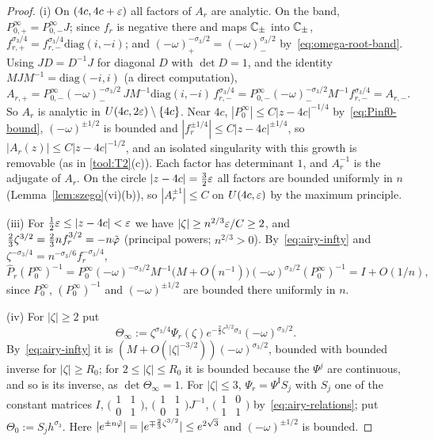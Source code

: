 \begin{proof}
(i) On $(4c,4c+\varepsilon)$ all factors of $A_r$ are analytic. On the band, $P^\infty_{0,+}=P^\infty_{0,-}J$; since $f_r$ is negative
there and maps $\mathbb{C}_\pm$ into $\mathbb{C}_\pm$, $f_{r,+}^{\sigma_3/4}=f_{r,-}^{\sigma_3/4}\mathrm{diag}(i,-i)$; and
$(-\omega)_+^{-\sigma_3/2}=(-\omega)_-^{\sigma_3/2}$ by~\eqref{eq:omega-root-band}. Using $JD=D^{-1}J$ for diagonal $D$ with
$\det D=1$, and the identity $MJM^{-1}=\mathrm{diag}(-i,i)$ (a direct computation),
\[
  A_{r,+}=P^\infty_{0,-}(-\omega)_-^{-\sigma_3/2}\,JM^{-1}\mathrm{diag}(i,-i)\,f_{r,-}^{\sigma_3/4}
  =P^\infty_{0,-}(-\omega)_-^{-\sigma_3/2}M^{-1}f_{r,-}^{\sigma_3/4}=A_{r,-}.
\]
So $A_r$ is analytic in $U(4c,2\varepsilon)\setminus\{4c\}$. Near $4c$, $|P^\infty_0|\le C|z-4c|^{-1/4}$ by~\eqref{eq:Pinf0-bound},
$(-\omega)^{\pm1/2}$ is bounded and $|f_r^{\pm1/4}|\le C|z-4c|^{\pm1/4}$, so $|A_r(z)|\le C|z-4c|^{-1/2}$, and an isolated
singularity with this growth is removable (as in \ref{tool:T2}(c)). Each factor has determinant $1$, and $A_r^{-1}$ is the
adjugate of $A_r$. On the circle $|z-4c|=\frac32\varepsilon$ all factors are bounded uniformly in $n$ (Lemma~\ref{lem:szego}(vi)(b)),
so $|A_r^{\pm1}|\le C$ on $U(4c,\varepsilon)$ by the maximum principle.

(iii) For $\frac12\varepsilon\le|z-4c|<\varepsilon$ we have $|\zeta|\ge n^{2/3}\varepsilon/C\ge2$, and $\frac23\zeta^{3/2}=\frac23nf_r^{3/2}=-n\tilde\varphi$
(principal powers; $n^{2/3}>0$). By~\eqref{eq:airy-infty} and $\zeta^{-\sigma_3/4}=n^{-\sigma_3/6}f_r^{-\sigma_3/4}$,
\[
  \hat P_r(P^\infty_0)^{-1}=P^\infty_0(-\omega)^{-\sigma_3/2}M^{-1}\bigl(M+O(n^{-1})\bigr)(-\omega)^{\sigma_3/2}(P^\infty_0)^{-1}=I+O(1/n),
\]
since $P^\infty_0$, $(P^\infty_0)^{-1}$ and $(-\omega)^{\pm1/2}$ are bounded there uniformly in $n$.

(iv) For $|\zeta|\ge2$ put
\[
  \Theta_\infty:=\zeta^{\sigma_3/4}\Psi_r(\zeta)e^{-\frac23\zeta^{3/2}\sigma_3}(-\omega)^{\sigma_3/2}.
\]
By~\eqref{eq:airy-infty} it is $(M+O(|\zeta|^{-3/2}))(-\omega)^{\sigma_3/2}$, bounded with bounded inverse for $|\zeta|\ge R_0$; for $2\le|\zeta|\le R_0$ it is
bounded because the $\Psi^j$ are continuous, and so is its inverse, as $\det\Theta_\infty=1$. For $|\zeta|\le3$,
$\Psi_r=\Psi^{\mathrm I}S_j$ with $S_j$ one of the constant matrices $I$, $\bigl(\begin{smallmatrix}1&1\\0&1\end{smallmatrix}\bigr)$,
$\bigl(\begin{smallmatrix}1&1\\0&1\end{smallmatrix}\bigr)J^{-1}$, $\bigl(\begin{smallmatrix}1&0\\1&1\end{smallmatrix}\bigr)$
by~\eqref{eq:airy-relations}; put $\Theta_0:=S_jh^{\sigma_3}$. Here $|e^{\pm n\tilde\varphi}|=|e^{\mp\frac23\zeta^{3/2}}|\le e^{2\sqrt3}$ and
$(-\omega)^{\pm1/2}$ is bounded.
\end{proof}

